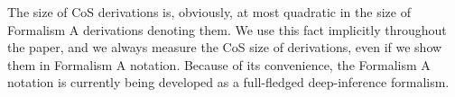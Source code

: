 The size of CoS derivations is, obviously, at most quadratic in the size of Formalism A derivations denoting them. We use this fact implicitly throughout the paper, and we always measure the CoS size of derivations, even if we show them in Formalism A notation. Because of its convenience, the Formalism A notation is currently being developed as a full-fledged deep-inference formalism.

